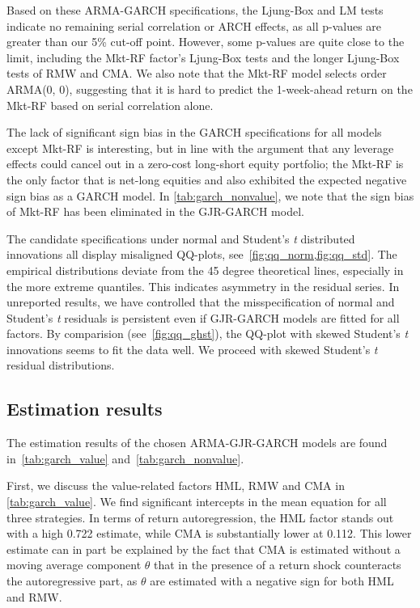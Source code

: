 Based on these ARMA-GARCH specifications, the Ljung-Box and LM tests indicate no remaining serial correlation or ARCH effects, as all p-values are greater than our 5\% cut-off point. However, some p-values are quite close to the limit, including the Mkt-RF factor's Ljung-Box tests and the longer Ljung-Box tests of RMW and CMA. We also note that the Mkt-RF model selects order ARMA(0, 0), suggesting that it is hard to predict the 1-week-ahead return on the Mkt-RF based on serial correlation alone.

The lack of significant sign bias in the GARCH specifications for all models except Mkt-RF is interesting, but in line with the argument that any leverage effects could cancel out in a zero-cost long-short equity portfolio; the Mkt-RF is the only factor that is net-long equities and also exhibited the expected negative sign bias as a GARCH model. In \autoref{tab:garch_nonvalue}, we note that the sign bias of Mkt-RF has been eliminated in the GJR-GARCH model. 

The candidate specifications under normal and Student's \textit{t} distributed innovations all display misaligned QQ-plots, see~\autoref{fig:qq_norm,fig:qq_std}. The empirical distributions deviate from the 45 degree theoretical lines, especially in the more extreme quantiles. This indicates asymmetry in the residual series. In unreported results, we have controlled that the misspecification of normal and Student's \textit{t} residuals is persistent even if GJR-GARCH models are fitted for all factors. By comparision (see~\autoref{fig:qq_ghst}), the QQ-plot with skewed Student's \textit{t} innovations seems to fit the data well. We proceed with skewed Student's \textit{t} residual distributions.


\subsection{Estimation results}
\label{sub:estimation_results}

The estimation results of the chosen ARMA-GJR-GARCH models are found in~\autoref{tab:garch_value} and~\autoref{tab:garch_nonvalue}. 

First, we discuss the value-related factors HML, RMW and CMA in \autoref{tab:garch_value}. We find significant intercepts in the mean equation for all three strategies. In terms of return autoregression, the HML factor stands out with a high 0.722 estimate, while CMA is substantially lower at 0.112. This lower estimate can in part be explained by the fact that CMA is estimated without a moving average component $\theta$ that in the presence of a return shock counteracts the autoregressive part, as $\theta$ are estimated with a negative sign for both HML and RMW. 


